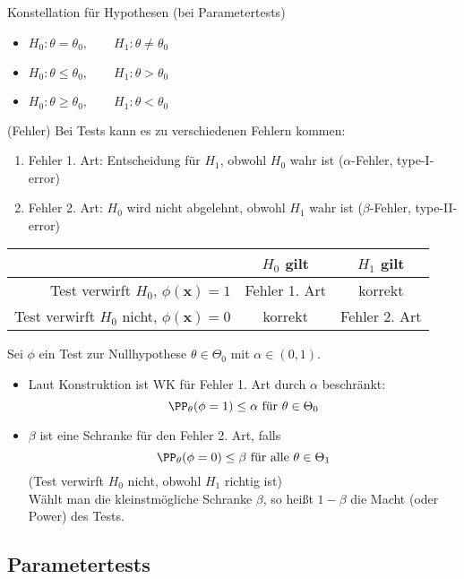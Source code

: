  Konstellation für Hypothesen (bei Parametertests)
\begin{itemize}
\item $H_0: \theta = \theta_0 ,\qquad H_1: \theta \not = \theta_0$
\item $H_0: \theta \leq \theta_0 ,\qquad H_1: \theta > \theta_0$
\item $H_0: \theta \geq \theta_0, \qquad H_1: \theta < \theta_0$
\end{itemize}

 (Fehler) Bei Tests kann es zu verschiedenen Fehlern kommen:
\begin{enumerate}
\item Fehler 1. Art: Entscheidung für $H_1$, obwohl $H_0$ wahr ist ($\alpha$-Fehler, type-I-error)\\
\item Fehler 2. Art: $H_0$ wird nicht abgelehnt, obwohl $H_1$ wahr ist ($\beta$-Fehler, type-II-error)\\
\end{enumerate}
\begin{tabular}{r | c c}
& $H_0$ gilt & $H_1$ gilt\\\hline
Test verwirft $H_0$, $\phi(\mathbf{x})=1$ & Fehler 1. Art & korrekt\\
Test verwirft $H_0$ nicht, $\phi(\mathbf{x})=0$ & korrekt & Fehler 2. Art
\end{tabular}

 Sei $\phi$ ein Test zur Nullhypothese $\theta \in \Theta_0$ mit $\alpha \in (0,1)$.
\begin{itemize}
\item Laut Konstruktion ist WK für Fehler 1. Art durch $\alpha$ beschränkt:
$$\PP_\theta (\phi =1 ) \leq \alpha \text{ für } \theta \in \Theta_0$$
\item $\beta$ ist eine Schranke für den Fehler 2. Art, falls
$$\PP_\theta (\phi =0 )\leq \beta \text{ für alle } \theta \in \Theta_1$$
(Test verwirft $H_0$ nicht, obwohl $H_1$ richtig ist)\\
Wählt man die kleinstmögliche Schranke $\beta$, so heißt $1-\beta$ die Macht (oder Power) des Tests.
\end{itemize}

\subsection{Parametertests}

